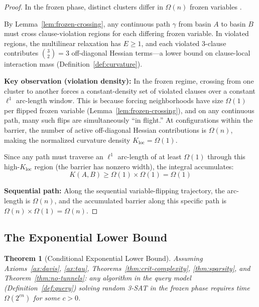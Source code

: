\documentclass[11pt,a4paper]{article}
\theoremstyle{plain}
\newtheorem{theorem}{Theorem}[section]
\theoremstyle{definition}
\theoremstyle{remark}
\begin{document}
\begin{proof}
In the frozen phase, distinct clusters differ in $\Omega(n)$ frozen variables \cite{krzakala2007}. 

By Lemma~\ref{lem:frozen-crossing}, any continuous path $\gamma$ from basin $A$ to basin $B$ must cross clause-violation regions for each differing frozen variable. In violated regions, the multilinear relaxation has $E \geq 1$, and each violated 3-clause contributes $\binom{3}{2} = 3$ off-diagonal Hessian terms---a lower bound on clause-local interaction mass (Definition~\ref{def:curvature}).

\textbf{Key observation (violation density):} In the frozen regime, crossing from one cluster to another forces a constant-density set of violated clauses over a constant $\ell^1$ arc-length window. This is because forcing neighborhoods have size $\Omega(1)$ per flipped frozen variable (Lemma~\ref{lem:frozen-crossing}), and on any continuous path, many such flips are simultaneously ``in flight.'' At configurations within the barrier, the number of active off-diagonal Hessian contributions is $\Omega(n)$, making the normalized curvature density $K_{\text{loc}} = \Omega(1)$.

Since any path must traverse an $\ell^1$ arc-length of at least $\Omega(1)$ through this high-$K_{\text{loc}}$ region (the barrier has nonzero width), the integral accumulates:
\begin{equation}
    K(A,B) \geq \Omega(1) \times \Omega(1) = \Omega(1)
\end{equation}

\textbf{Sequential path:} Along the sequential variable-flipping trajectory, the arc-length is $\Omega(n)$, and the accumulated barrier along this specific path is $\Omega(n) \times \Omega(1) = \Omega(n)$.
\end{proof}

\subsection{The Exponential Lower Bound}

\begin{theorem}[Conditional Exponential Lower Bound]
\label{thm:exp-lower}
Assuming Axioms~\ref{ax:davis}, \ref{ax:tau}, Theorems~\ref{thm:crit-complexity}, \ref{thm:sparsity}, and Theorem~\ref{thm:no-tunnels}: any algorithm in the query model (Definition~\ref{def:query}) solving random 3-SAT in the frozen phase requires time $\Omega(2^{cn})$ for some $c > 0$.
\end{theorem}
\end{document}

